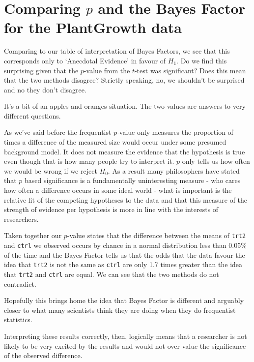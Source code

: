 \documentclass[
]{book}
\begin{document}
\hypertarget{comparing-p-and-the-bayes-factor-for-the-plantgrowth-data}{%
\section{\texorpdfstring{Comparing \(p\) and the Bayes Factor for the PlantGrowth data}{Comparing p and the Bayes Factor for the PlantGrowth data}}\label{comparing-p-and-the-bayes-factor-for-the-plantgrowth-data}}

Comparing to our table of interpretation of Bayes Factors, we see that this corresponds only to `Anecdotal Evidence' in favour of \(H_1\). Do we find this surprising given that the \(p\)-value from the \(t\)-test was significant? Does this mean that the two methods disagree? Strictly speaking, no, we shouldn't be surprised and no they don't disagree.

It's a bit of an apples and oranges situation. The two values are answers to very different questions.

As we've said before the frequentist \(p\)-value only measures the proportion of times a difference of the measured size would occur under some presumed background model. It does not measure the evidence that the hypothesis is true even though that is how many people try to interpret it. \(p\) only tells us how often we would be wrong if we reject \(H_0\). As a result many philosophers have stated that \(p\) based significance is a fundamentally uninteresting measure - who cares how often a difference occurs in some ideal world - what is important is the relative fit of the competing hypotheses to the data and that this measure of the strength of evidence per hypothesis is more in line with the interests of researchers.

Taken together our \(p\)-value states that the difference between the means of \texttt{trt2} and \texttt{ctrl} we observed occurs by chance in a normal distribution less than 0.05\% of the time and the Bayes Factor tells us that the odds that the data favour the idea that \texttt{trt2} is not the same as \texttt{ctrl} are only 1.7 times greater than the idea that \texttt{trt2} and \texttt{ctrl} are equal. We can see that the two methods do not contradict.

Hopefully this brings home the idea that Bayes Factor is different and arguably closer to what many scientists think they are doing when they do frequentist statistics.

Interpreting these results correctly, then, logically means that a researcher is not likely to be very excited by the results and would not over value the significance of the observed difference.
\end{document}
